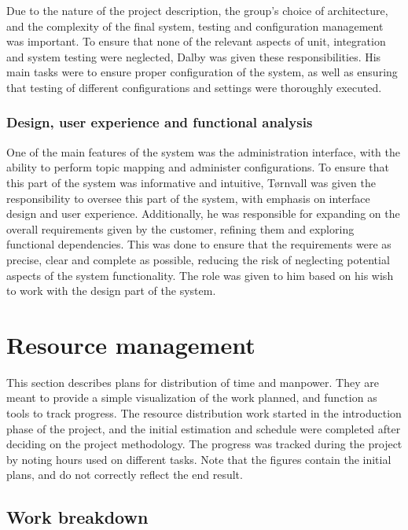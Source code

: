 Due to the nature of the project description, the group's choice of architecture, and the complexity of the final system, testing and configuration management was important. To ensure that none of the relevant aspects of unit, integration and system testing were neglected, Dalby was given these responsibilities. His main tasks were to ensure proper configuration of the system, as well as ensuring that testing of different configurations and settings were thoroughly executed.

\subsubsection{Design, user experience and functional analysis}
\label{subsec:process_and_methodology-project_organization-design_user_experience_and_functional_analysis}

One of the main features of the system was the administration interface, with the ability to perform topic mapping and administer configurations. To ensure that this part of the system was informative and intuitive, Tørnvall was given the responsibility to oversee this part of the system, with emphasis on interface design and user experience. Additionally, he was responsible for expanding on the overall requirements given by the customer, refining them and exploring functional dependencies. This was done to ensure that the requirements were as precise, clear and complete as possible, reducing the risk of neglecting potential aspects of the system functionality. The role was given to him based on his wish to work with the design part of the system.

\section{Resource management}
\label{sec:process_and_methodology-resource_management}

This section describes plans for distribution of time and manpower. They are meant to provide a simple visualization of the work planned, and function as tools to track progress. The resource distribution work started in the introduction phase of the project, and the initial estimation and schedule were completed after deciding on the project methodology. The progress was tracked during the project by noting hours used on different tasks. Note that the figures contain the initial plans, and do not correctly reflect the end result.

\subsection{Work breakdown}
\label{subsec:process_and_methodology-resource_management-work_breakdown}

